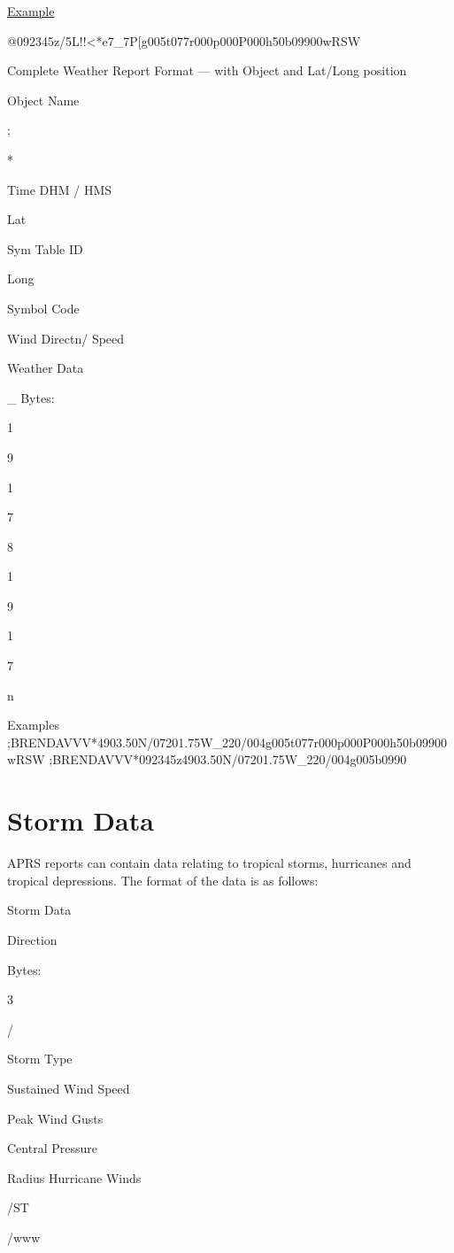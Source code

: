 \underline{Example}
\begin{description}
\item @092345z/5L!!<*e7\_7P[g005t077r000p000P000h50b09900wRSW
\end{description}

  
  Complete Weather Report Format — with Object and Lat/Long position

  Object
Name

;

*

Time
DHM /
HMS

Lat

Sym
Table
ID

Long

Symbol
Code

Wind
Directn/
Speed

Weather
Data

_
Bytes:

1

9

1

7

8

1

9

1

7

n


Examples
;BRENDAVVV*4903.50N/07201.75W_220/004g005t077r000p000P000h50b09900wRSW
;BRENDAVVV*092345z4903.50N/07201.75W_220/004g005b0990



\section{Storm Data}

APRS reports can contain data relating to tropical storms, hurricanes and
tropical depressions. The format of the data is as follows:

Storm Data

Direction

Bytes:

3

/

Storm
Type

Sustained
Wind
Speed

Peak
Wind
Gusts

Central
Pressure

Radius
Hurricane
Winds

/ST

/www

